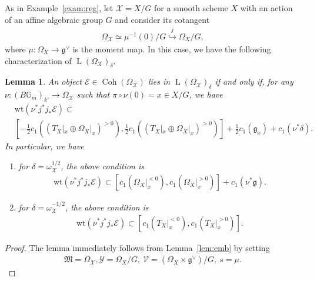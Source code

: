 \documentclass [11pt,oneside,a4paper,mathscr]{amsart}
\newtheorem{lemma}[thm]{Lemma}
\theoremstyle{definition}
\newcommand{\LL}{\operatorname{L}}
\newcommand{\X}{\mathcal{X}}
\newcommand{\bgm}{B\mathbb{G}_m}
\newcommand{\fg}{\mathfrak{g}}
\newcommand{\Coh}{\operatorname{Coh}}
\newcommand{\wt}{\mathrm{wt}}
\begin{document}
As in Example~\ref{exam:reg}, let $\X=X/G$ 
for a smooth scheme $X$ with an action of an affine algebraic 
group $G$ and consider its cotangent 
\begin{align*}
    \Omega_{\X} \simeq \mu^{-1}(0)/G
    \stackrel{j}{\hookrightarrow} \Omega_X/G,
\end{align*}
where $\mu \colon \Omega_X \to \fg^{\vee}$ is the moment map. 
In this case, we have the following characterization of 
$\LL(\Omega_{\X})_{\delta}$. 
\begin{lemma}\label{lem:char2}
    An object $\mathcal{E} \in \Coh(\Omega_{\X})$ lies in 
    $\LL(\Omega_{\X})_{\delta}$
    if and only if, for any $\nu \colon (\bgm)_{k'} \to \Omega_{\X}$ such that 
    $\pi \circ \nu(0)=x \in X/G$, 
    we have
    \begin{align*}
        &\wt(\nu^{\ast}j^{\ast}j_{\ast}\mathcal{E})
        \subset \\
        &\left[ -\frac{1}{2}c_1((T_X|_{x} \oplus \Omega_X|_{x})^{>0}), 
        \frac{1}{2}c_1((T_X|_{x} \oplus \Omega_X|_{x})^{>0})
        \right]+\frac{1}{2}c_1(\mathfrak{g}_x)+c_1(\nu^*\delta).
    \end{align*}
    In particular, we have 
    \begin{enumerate}
\item for $\delta=\omega_{\X}^{1/2}$, the above condition is 
\begin{align*}
        \wt(\nu^{\ast}j^{\ast}j_{\ast}\mathcal{E})
        \subset \left[c_1 (\Omega_X|_{x}^{<0}), c_1(\Omega_X|_{x}^{>0}) \right]
        +c_1(\nu^{*}\mathfrak{g}). 
        \end{align*}
\item for $\delta=\omega_{\X}^{-1/2}$, the above condition is 
 \begin{align*}
        \wt(\nu^{\ast}j^{\ast}j_{\ast}\mathcal{E})
        \subset \left[c_1 (T_X|_{x}^{<0}), c_1(T_X|_{x}^{>0}) \right].
        \end{align*}    
        \end{enumerate}
    \end{lemma}
    \begin{proof}
        The lemma immediately follows from Lemma~\ref{lem:emb}
        by setting 
        \begin{align*}\mathfrak{M}=\Omega_{\X},     \mathcal{Y}=\Omega_X/G, \ \mathcal{V}=(\Omega_X \times \mathfrak{g}^{\vee})/G, \ s=\mu. 
        \end{align*}
            \end{proof}
\end{document}
